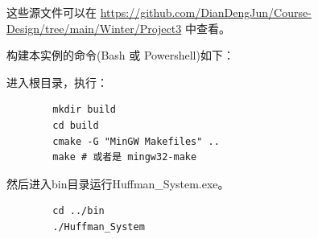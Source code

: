 \documentclass{ctexart}
\begin{document}
    这些源文件可以在 \url{https://github.com/DianDengJun/Course-Design/tree/main/Winter/Project3} 中查看。
    
    构建本实例的命令(Bash 或 Powershell)如下：
    
    进入根目录，执行：
    
    \begin{verbatim}
        mkdir build
        cd build
        cmake -G "MinGW Makefiles" ..
        make # 或者是 mingw32-make
    \end{verbatim}

    然后进入bin目录运行Huffman\_System.exe。

    \begin{verbatim}
        cd ../bin
        ./Huffman_System
    \end{verbatim}
\end{document}
